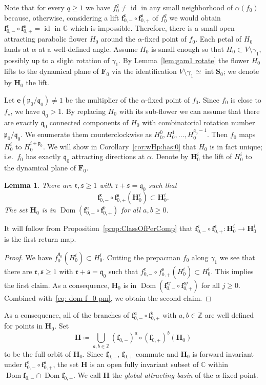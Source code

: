 \documentclass[]{amsart}
\newcommand{\Dom}{\operatorname {Dom}}
\newcommand\intr{\operatorname{int}}
\newcommand{\bF}{{\mathbf F}}
\newcommand{\bS}{{\mathbf S}}
\newcommand{\bH}{{\mathbf H}}
\newcommand{\bbf}{{\mathbf f}}
\newcommand{\str}{{\star}}
\newcommand{\pp}{\mathfrak{p}}
\newcommand{\ee}{\mathbf e}
\renewcommand{\qq}{\mathfrak{q}}
\newcommand{\rr}{\mathfrak{r}}
\renewcommand{\ss}{\mathfrak{s}}
\newcommand{\C}{\mathbb{C}}
\newcommand{\Z}{\mathbb{Z}}
\newtheorem{lem}[thm]{Lemma}
\theoremstyle{remark}
\numberwithin{equation}{section}
\theoremstyle{definition}
\newcommand{\id}{\operatorname{id}}
\begin{document}
Note that for every $q\ge 1$ we have $f^q_0\not= \id$ in any small neighborhood of $\alpha(f_0)$ because, otherwise, considering a lift $\bbf^\rr_{0,-}\circ \bbf_{0,+}^\ss$ of $f_0^q$ we would obtain $\bbf^\rr_{0,-}\circ \bbf_{0,+}^\ss=\id$ in $\C$ which is impossible. Therefore, there is a small open attracting parabolic flower $H_{0}$ around the $\alpha$-fixed point of $f_0$. Each petal of $H_0$ lands at $\alpha$ at a well-defined angle. Assume $H_{0}$ is small enough so that $H_{0}\subset V\setminus \gamma_1$, possibly up to a slight rotation of $\gamma_1$. By Lemma~\ref{lem:gam1 rotate} the flower $H_0$ lifts to the dynamical plane of $\bF_0$ via the identification $V\setminus \gamma_1\simeq \intr \bS_{0}$; we denote by $\bH_{{0}}$ the lift. 


 Let $\ee (\pp_0/\qq_0)\not=1$ be the multiplier of the $\alpha$-fixed point of $f_0$. Since $f_0$ is close to $f_\str$, we have $\qq_0>1$. By replacing $H_0$ with its sub-flower we can assume that there are exactly $\qq_0$ connected components of $H_{0}$ with combinatorial rotation number $\pp_0/\qq_0$. We enumerate them counterclockwise as $H_0^0,H_0^1,\dots, H_0^{\qq_0-1}$. Then $f_0$ maps $H_0^i$ to $H_0^{i+\pp_0}$. We will show in Corollary~\ref{cor:wHp:has:0} that $H_0$ is in fact unique; i.e.~$f_0$ has exactly $\qq_0$ attracting directions at $\alpha$. Denote by $\bH_0^i$ the lift of $H_0^i$ to the dynamical plane of $\bF_0$. 
 
 \begin{lem}
 \label{lem: wH is forw invar}
 There are $\rr,\ss\ge 1$ with $\rr+\ss=\qq_0$ such that 
 \[\bbf_{0,-}^\rr\circ\bbf_{0,+}^\ss (\bH_0^i)\subset \bH_0^i.\] 
 The set $\bH_0$ is in $\Dom(\bbf^a_{0,-}\circ \bbf^b_{0,+})$ for all $a,b\ge 0$.
 \end{lem}
 \noindent It will follow from Proposition~\ref{prop:ClassOfPerComp} that $\bbf_{0,-}^\rr\circ\bbf_{0,+}^\ss\colon \bH_0^i\to \bH_0^i$ is the first return map.
\begin{proof}
We have $f_0^{\qq_0}(H_0^i)\subset H_0^i$. Cutting the prepacman $f_0$ along $\gamma_1$ we see that there are $\rr,\ss\ge 1$ with $\rr+\ss=\qq_0$ such that 
$f_{0,-}^\rr\circ f_{0,+}^\ss (H_0^i)\subset H_0^i.$ This implies the first claim. As a consequence, $\bH_0$ is in $\Dom(\bbf^{\rr j}_{0,-}\circ \bbf^{\ss j}_{0,+})$ for all $j\ge 0$. Combined with~\eqref{eq: dom f_0 pm}, we obtain the second claim. 
\end{proof} 
 As a consequence, all of the branches of $\bbf^a_{0,-}\circ \bbf^b_{0,+}$ with $a,b\in \Z$ are well defined for points in $\bH_0$. Set \[\bH\coloneqq \bigcup_{a,b\in \Z} (\bbf_{0,-})^a\circ (\bbf_{0,+})^{b} \left(\bH_{0} \right)\]
 to be the full orbit of $\bH_{{0}}$. Since $\bbf_{0,-}$, $\bbf_{0,+}$ commute and $\bH_0$ is forward invariant under $\bbf_{0,-}^\rr\circ\bbf_{0,+}^\ss$, the set $\bH$ is an open fully invariant subset of $\C$ within ${\Dom \bbf_{0,-}  \cap \Dom \bbf_{0,+} }$. We call $\bH$ the \emph{global attracting basin} of the $\alpha$-fixed point.  
\end{document}
